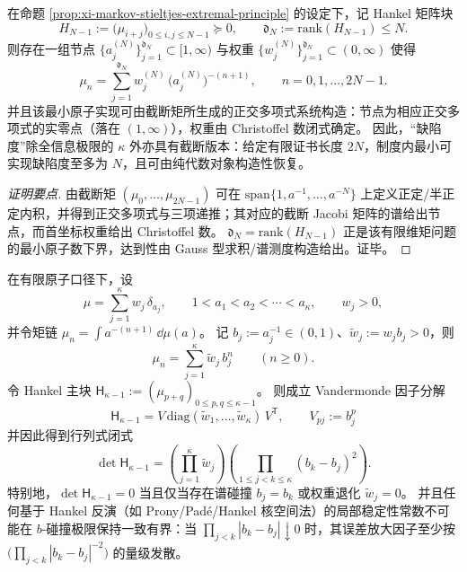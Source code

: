 \begin{proposition}\label{prop:xi-truncated-moment-min-atomic-realization}
在命题 \ref{prop:xi-markov-stieltjes-extremal-principle} 的设定下，记 Hankel 矩阵块
\[
H_{N-1}:=\bigl(\mu_{i+j}\bigr)_{0\le i,j\le N-1}\succeq 0,
\qquad
\mathfrak{d}_N:=\mathrm{rank}(H_{N-1})\le N.
\]
则存在一组节点 \(\{a_j^{(N)}\}_{j=1}^{\mathfrak{d}_N}\subset[1,\infty)\) 与权重 \(\{w_j^{(N)}\}_{j=1}^{\mathfrak{d}_N}\subset(0,\infty)\) 使得
\[
\mu_n=\sum_{j=1}^{\mathfrak{d}_N} w_j^{(N)}\,\bigl(a_j^{(N)}\bigr)^{-(n+1)},
\qquad n=0,1,\dots,2N-1.
\]
并且该最小原子实现可由截断矩所生成的正交多项式系统构造：节点为相应正交多项式的实零点（落在 \((1,\infty)\)），权重由 Christoffel 数闭式确定。
因此，“缺陷度”除全信息极限的 \(\kappa\) 外亦具有截断版本：给定有限证书长度 \(2N\)，制度内最小可实现缺陷度至多为 \(N\)，且可由纯代数对象构造性恢复。
\end{proposition}
\begin{proof}[证明要点]
由截断矩 \((\mu_0,\dots,\mu_{2N-1})\) 可在 \(\mathrm{span}\{1,a^{-1},\dots,a^{-N}\}\) 上定义正定/半正定内积，并得到正交多项式与三项递推；其对应的截断 Jacobi 矩阵的谱给出节点，而首坐标权重给出 Christoffel 数。
\(\mathfrak{d}_N=\mathrm{rank}(H_{N-1})\) 正是该有限维矩问题的最小原子数下界，达到性由 Gauss 型求积/谱测度构造给出。证毕。
\end{proof}

\begin{proposition}\label{prop:xi-depth-hankel-determinant-vandermonde-square}
在有限原子口径下，设
\[
\mu=\sum_{j=1}^{\kappa}w_j\,\delta_{a_j},
\qquad
1<a_1<a_2<\cdots<a_\kappa,\qquad w_j>0,
\]
并令矩链 \(\mu_n=\int a^{-(n+1)}\,\dd\mu(a)\)。
记 \(b_j:=a_j^{-1}\in(0,1)\)、\(\widetilde w_j:=w_j b_j>0\)，则
\[
\mu_n=\sum_{j=1}^{\kappa}\widetilde w_j\,b_j^{n}\qquad(n\ge 0).
\]
令 Hankel 主块 \(\mathsf H_{\kappa-1}:=(\mu_{p+q})_{0\le p,q\le \kappa-1}\)。
则成立 Vandermonde 因子分解
\[
\boxed{\;
\mathsf H_{\kappa-1}=V\,\mathrm{diag}(\widetilde w_1,\dots,\widetilde w_\kappa)\,V^{\mathsf T},\qquad
V_{pj}:=b_j^{p}\;}
\]
并因此得到行列式闭式
\begin{equation}\label{eq:xi-depth-hankel-det-vandermonde}
\boxed{\;
\det \mathsf H_{\kappa-1}
=\left(\prod_{j=1}^{\kappa}\widetilde w_j\right)
\left(\prod_{1\le j<k\le \kappa}(b_k-b_j)^2\right).\;}
\end{equation}
特别地，\(\det \mathsf H_{\kappa-1}=0\) 当且仅当存在谱碰撞 \(b_j=b_k\) 或权重退化 \(\widetilde w_j=0\)。
并且任何基于 Hankel 反演（如 Prony/Pad\'e/Hankel 核空间法）的局部稳定性常数不可能在 \(b\)-碰撞极限保持一致有界：当 \(\prod_{j<k}|b_k-b_j|\downarrow 0\) 时，其误差放大因子至少按 \(\bigl(\prod_{j<k}|b_k-b_j|^{-2}\bigr)\) 的量级发散。
\end{proposition}

